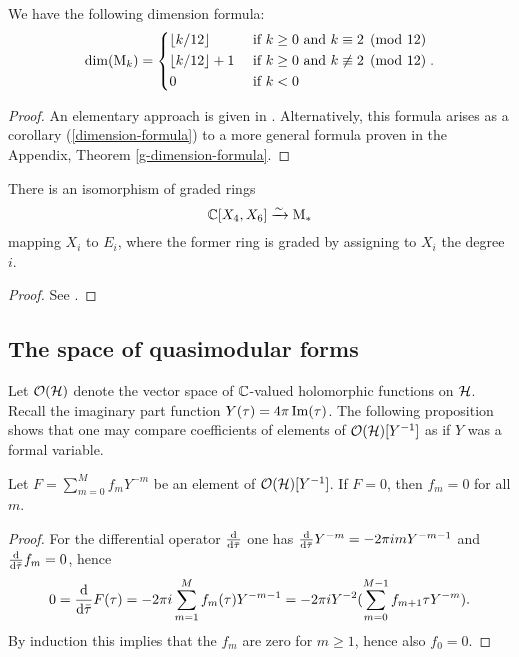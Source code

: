 \begin{prop} \label{baby-dimension-formula}
 We have the following dimension formula:
 \[
  \dim(\mathrm{M}_k)=\begin{dcases}
                      \left \lfloor {k}/{12} \right\rfloor & \text{ if $k\geq 0$ and $k\equiv 2 \pmod{12}$}\\
                      \left \lfloor {k}/{12} \right\rfloor+1 & \text{ if $k\geq 0$ and $k\not\equiv 2 \pmod{12}$}\\
                      0 & \text{ if $k<0$}
                     \end{dcases}.
 \]
\end{prop}
\begin{proof}
 An elementary approach is given in \cite[Ch.~VII, Corollary 1]{Serre1973}. Alternatively, this formula arises as a corollary (\ref{dimension-formula}) to a more general formula proven in the Appendix, Theorem \ref{g-dimension-formula}.
\end{proof}

\begin{prop}
 There is an isomorphism of graded rings \[\mathbb{C}[X_4, X_6]\xrightarrow{\sim} \mathrm{M}_*\] mapping $X_i$ to $E_i$, where the former ring is graded by assigning to $X_i$ the degree $i$.
\end{prop}
\begin{proof}
 See \cite[Ch.~VII, Corollary 2]{Serre1973}.
\end{proof}

\subsection{The space of quasimodular forms}

Let $\mathcal{O}(\mathcal{H})$ denote the vector space of $\mathbb{C}$-valued holomorphic functions on $\mathcal{H}$. Recall the imaginary part function $Y(\tau)=4\pi\operatorname{Im}(\tau)$. The following proposition shows that one may compare coefficients of elements of $\mathcal{O}(\mathcal{H})[Y^{-1}]$ as if $Y$ was a formal variable.

\begin{prop}
 Let $F=\sum_{m=0}^Mf_mY^{-m}$ be an element of $\mathcal{O}(\mathcal{H})[Y^{-1}]$. If $F=0$, then $f_m=0$ for all $m$.
\end{prop}
\begin{proof}
 For the differential operator $\frac{\mathrm{d}}{\mathrm{d}\bar{\tau}}$ one has $\frac{\mathrm{d}}{\mathrm{d}\bar{\tau}}Y^{-m}=-2\pi imY^{-m-1}$ and $\frac{\mathrm{d}}{\mathrm{d}\bar{\tau}}f_m=0$, hence \[0=\frac{\mathrm{d}}{\mathrm{d}\bar{\tau}}F(\tau)=-2\pi i\sum_{m=1}^{M}f_m(\tau)Y^{-m-1}=-2\pi iY^{-2}(\sum_{m=0}^{M-1}f_{m+1}{\tau}Y^{-m}).\]
 By induction this implies that the $f_m$ are zero for $m\geq 1$, hence also $f_0=0$.
\end{proof}

